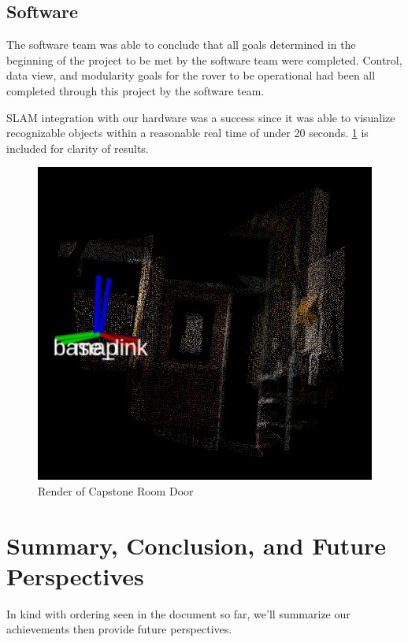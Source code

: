 \documentclass[a4paper, 10pt]{article}
\begin{document}
    \subsection{Software}
    The software team was able to conclude that all goals determined in the beginning of the project to be met by the software team were completed. Control, data view, and modularity goals for the rover to be operational had been all completed through this project by the software team. 
    
    SLAM integration with our hardware was a success since it was able to visualize recognizable objects within a reasonable real time of under 20 seconds. \ref{Door Render} is included for clarity of results.

		\begin{figure} [!h]
			\centering
			\includegraphics[scale=0.8]{Photos/Capstone Room Door.png}
			\caption{Render of Capstone Room Door}
			\label{Door Render}
		\end{figure}
		
\section{Summary, Conclusion, and Future Perspectives}
In kind with ordering seen in the document so far, we'll summarize our achievements then provide future perspectives.
\end{document}

